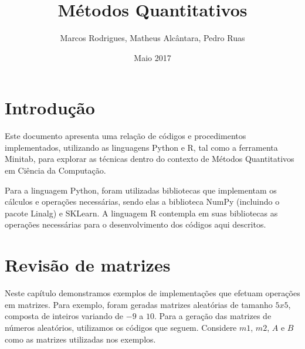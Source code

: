 \documentclass{article}
\title{Métodos Quantitativos}
\author{Marcos Rodrigues, Matheus Alcântara, Pedro Ruas}
\date{Maio 2017}
\begin{document}
\maketitle

\section{Introdução}

Este documento apresenta uma relação de códigos e procedimentos implementados, utilizando as linguagens Python e R, tal como a ferramenta Minitab, para explorar as técnicas dentro do contexto de Métodos Quantitativos em Ciência da Computação.

Para a linguagem Python, foram utilizadas bibliotecas que implementam os cálculos e operações necessárias, sendo elas a biblioteca NumPy (incluindo o pacote Linalg) e SKLearn.
A linguagem R contempla em suas bibliotecas as operações necessárias para o desenvolvimento dos códigos aqui descritos.


\section{Revisão de matrizes}

Neste capítulo demonstramos exemplos de implementações que efetuam operações em matrizes. Para exemplo, foram geradas matrizes aleatórias de tamanho $5x5$, composta de inteiros variando de $-9$ a $10$. Para a geração das matrizes de números aleatórios, utilizamos os códigos que seguem. Considere $m1$, $m2$, $A$ e $B$ como as matrizes utilizadas nos exemplos.
\end{document}
